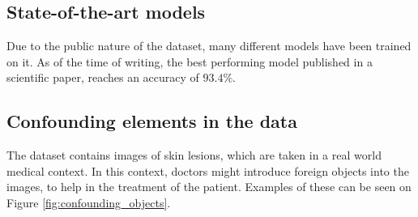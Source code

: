 \subsection{State-of-the-art models}\label{sec:state-of-the-art}
Due to the public nature of the dataset, many different models have been trained on it.
As of the time of writing, the best performing model published in a scientific paper,
reaches an accuracy of $93.4\%$\cite{datta2021soft}.

\subsection{Confounding elements in the data} \label{sec:confounding}
The dataset contains images of skin lesions, which are taken in a real world medical context.
In this context, doctors might introduce foreign objects into the images,
to help in the treatment of the patient.
Examples of these can be seen on Figure \ref{fig:confounding_objects}.

